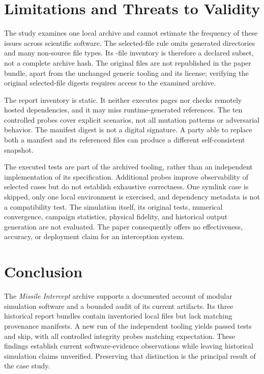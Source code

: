 \documentclass[11pt,a4paper]{article}
\begin{document}
\section{Limitations and Threats to Validity}
The study examines one local archive and cannot estimate the frequency of these issues across scientific software. The selected-file rule omits generated directories and many non-source file types. Its \SelectedFiles-file inventory is therefore a declared subset, not a complete archive hash. The original files are not republished in the paper bundle, apart from the unchanged generic tooling and its license; verifying the original selected-file digests requires access to the examined archive.

The report inventory is static. It neither executes pages nor checks remotely hosted dependencies, and it may miss runtime-generated references. The ten controlled probes cover explicit scenarios, not all mutation patterns or adversarial behavior. The manifest digest is not a digital signature. A party able to replace both a manifest and its referenced files can produce a different self-consistent snapshot.

The executed tests are part of the archived tooling, rather than an independent implementation of its specification. Additional probes improve observability of selected cases but do not establish exhaustive correctness. One symlink case is skipped, only one local environment is exercised, and dependency metadata is not a compatibility test. The simulation itself, its original tests, numerical convergence, campaign statistics, physical fidelity, and historical output generation are not evaluated. The paper consequently offers no effectiveness, accuracy, or deployment claim for an interception system.

\section{Conclusion}
The \emph{Missile Intercept} archive supports a documented account of modular simulation software and a bounded audit of its current artifacts. Its three historical report bundles contain \ReportAssets inventoried local files but lack matching provenance manifests. A new run of the independent tooling yields \TestsPassed passed tests and \TestsSkipped skip, with all \ProbeCount controlled integrity probes matching expectation. These findings establish current software-evidence observations while leaving historical simulation claims unverified. Preserving that distinction is the principal result of the case study.
\end{document}

